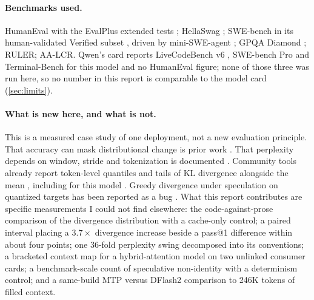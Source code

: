 \paragraph{Benchmarks used.} HumanEval \citep{chen2021humaneval} with the EvalPlus extended tests
\citep{evalplus}; HellaSwag \citep{zellers2019hellaswag}; SWE-bench \citep{jimenez2024swebench} in its
human-validated Verified subset \citep{openai2024swebenchverified}, driven by mini-SWE-agent
\citep{yang2024sweagent,miniswe}; GPQA Diamond \citep{rein2023gpqa}; RULER; AA-LCR. Qwen's card
reports LiveCodeBench v6 \citep{jain2025livecodebench}, SWE-bench Pro and Terminal-Bench
\citep{merrill2026terminalbench} for this model and no HumanEval figure; none of those three was run
here, so no number in this report is comparable to the model card (\cref{sec:limits}).

\paragraph{What is new here, and what is not.} This is a measured case study of one deployment, not
a new evaluation principle. That accuracy can mask distributional change is prior work
\citep{dutta2024accuracy}. That perplexity depends on window, stride and tokenization is documented
\citep{hf_perplexity_guide}. Community tools already report token-level quantiles and tails of KL
divergence alongside the mean \citep{mlx_kld}, including for this model
\citep{malaiwah_kld_method}. Greedy divergence under speculation on quantized targets has been
reported as a bug \citep{llamacpp_issue25618}. What this report contributes are specific measurements
I could not find elsewhere: the code-against-prose comparison of the divergence distribution with a
cache-only control; a paired interval placing a $3.7\times$ divergence increase beside a pass@1
difference within about four points; one 36-fold perplexity swing decomposed into its conventions; a
bracketed context map for a hybrid-attention model on two unlinked consumer cards; a benchmark-scale
count of speculative non-identity with a determinism control; and a same-build MTP versus DFlash2
comparison to 246K tokens of filled context.
